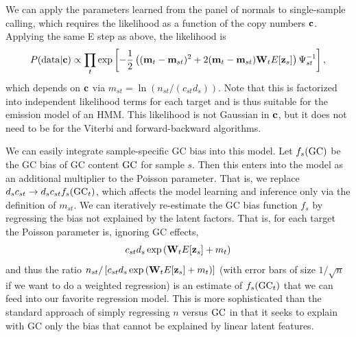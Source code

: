 \documentclass[nofootinbib,amssymb,amsmath]{revtex4}
\newcommand{\vc}{{\bf c}}
\newcommand{\vz}{{\bf z}}
\newcommand{\vm}{{\bf m}}
\newcommand{\vW}{{\bf W}}
\begin{document}
We can apply the parameters learned from the panel of normals to single-sample calling, which requires the likelihood as a function of the copy numbers $\vc$.  Applying the same E step as above, the likelihood is
\begin{equation}
P({\rm data} | \vc) \propto \prod_t \exp \left[ -\frac{1}{2} \left(  (\vm_t - \vm_{st})^2 +2 (\vm_t - \vm_{st}) \vW_{t} E[\vz_{s}] \right)\Psi_{st}^{-1} \right],
\end{equation}
which depends on $\vc$ via $m_{st} = \ln \left( n_{st} / (c_{st} d_s) \right)$.  Note that this is factorized into independent likelihood terms for each target and is thus suitable for the emission model of an HMM.  This likelihood is not Gaussian in $\vc$, but it does not need to be for the Viterbi and forward-backward algorithms.

We can easily integrate sample-specific GC bias into this model.  Let $f_s({\rm GC})$ be the GC bias of GC content ${\rm GC}$ for sample $s$.  Then this enters into the model as an additional multiplier to the Poisson parameter.  That is, we replace $d_s c_{st} \rightarrow d_s c_{st} f_s({\rm GC}_t)$, which affects the model learning and inference only via the definition of $m_{st}$.  We can iteratively re-estimate the GC bias function $f_s$ by regressing the bias not explained by the latent factors.  That is, for each target the Poisson parameter is, ignoring GC effects,
\begin{equation}
c_{st} d_s \exp \left( \vW_t E[\vz_s] + m_t \right)
\end{equation}
and thus the ratio $n_{st} / \left[ c_{st} d_s \exp \left( \vW_t E[\vz_s] + m_t \right) \right]$ (with error bars of size $1/\sqrt{n}$ if we want to do a weighted regression) is an estimate of $f_s({\rm GC}_t)$ that we can feed into our favorite regression model.  This is more sophisticated than the standard approach of simply regressing $n$ versus ${\rm GC}$ in that it seeks to explain with GC only the bias that cannot be explained by linear latent features.

\appendix
\end{document}
